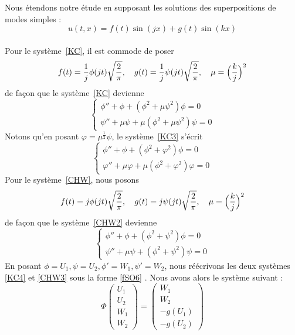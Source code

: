 \documentclass[11pt,a4paper]{article}
\begin{document}
Nous étendons notre étude en supposant les solutions des superpositions de modes simples : 
 \begin{equation} 
 u(t,x)= f(t) \sin ( j x) + g (t) \sin ( k x )
 \end{equation} \\
 Pour le système~\eqref{KC}, il est commode de poser
\begin{equation} \label{KC2} 
f (t)= \frac {1} {j}  \phi   ( j t )  \sqrt{\frac {2} {\pi }} , \quad g (t) = \frac {1} {j}  \psi   ( j t )  \sqrt{\frac {2} {\pi }} , \quad \mu =  \Bigl( \frac {k} {j} \Bigr)^2
\end{equation} 
de façon que le système~\eqref{KC} devienne
 \begin{equation} \label{KC3} 
\begin{cases} 
\phi  '' + \phi  +    ( \phi ^2 + \mu  \psi ^2 ) \phi  =0 \\
\psi  '' + \mu \psi  +  \mu ( \phi ^2 + \mu  \psi ^2 ) \psi  =0 
\end{cases} 
\end{equation} 
Notons qu'en posant $ \varphi  = \mu ^{\frac {1} {2}} \psi $, le système~\eqref{KC3} s'écrit
 \begin{equation} \label{KC4} 
\begin{cases} 
\phi  '' + \phi  +    ( \phi ^2 +   \varphi ^2 ) \phi  =0 \\
\varphi  '' + \mu  \varphi +  \mu ( \phi ^2 +   \varphi ^2 )  \varphi =0 
\end{cases} 
\end{equation} 
Pour le système~\eqref{CHW}, nous posons
\begin{equation} \label{CHW2} 
f (t)= j \phi   ( j t ) \sqrt{\frac {2} {\pi }} , \quad g (t) = j \psi   ( j t ) \sqrt{\frac {2} {\pi }} , \quad \mu =  \Bigl( \frac {k} {j} \Bigr)^2
\end{equation} 
de façon que le système~\eqref{CHW2} devienne
 \begin{equation} \label{CHW3} 
\begin{cases} 
\phi  '' + \phi  +    ( \phi ^2 + \psi ^2 ) \phi  =0 \\
\psi  '' + \mu \psi  +  ( \phi ^2 + \psi ^2 ) \psi  =0 
\end{cases} 
\end{equation} 
En posant $\phi = U_{1}, \psi = U_{2}, \phi ' = W_{1}, \psi ' = W_{2}$, nous réécrivons les deux systèmes \eqref{KC4} et \eqref{CHW3} sous la forme \eqref{fSO6} . Nous avons alors le système suivant :
\begin{equation} \label{fSO6} 
\Phi \begin{pmatrix} U_{1}\\ U_{2} \\W_{1} \\ W_{2}  \end{pmatrix} = \begin{pmatrix} W_{1}\\ W_{2} \\ - g(U_{1})\\ -g(U_{2}) \end{pmatrix} 
\end{equation} 
\end{document}
